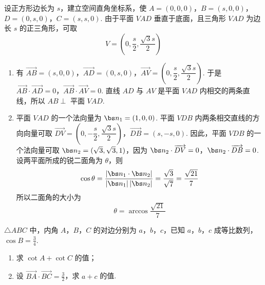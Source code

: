 \begin{solution}
设正方形边长为 \(s\)，建立空间直角坐标系，使 \(A=(0,0,0)\)，\(B=(s,0,0)\)，\(D=(0,s,0)\)，\(C=(s,s,0)\).
由于平面 \(VAD\) 垂直于底面，且三角形 \(VAD\) 为边长 \(s\) 的正三角形，可取
\[
V=\left(0,\dfrac{s}{2},\dfrac{\sqrt{3}s}{2}\right)
\]

\begin{enumerate}
\item 有 \(\overrightarrow{AB}=(s,0,0)\)，\(\overrightarrow{AD}=(0,s,0)\)，\(\overrightarrow{AV}=\left(0,\dfrac{s}{2},\dfrac{\sqrt{3}s}{2}\right)\). 于是 \(\overrightarrow{AB}\cdot\overrightarrow{AD}=0\)，\(\overrightarrow{AB}\cdot\overrightarrow{AV}=0\). 直线 \(AD\) 与 \(AV\) 是平面 \(VAD\) 内相交的两条直线，所以 \(AB\perp\) 平面 \(VAD\).

\item 平面 \(VAD\) 的一个法向量为 \(\bs n_{1}=(1,0,0)\). 平面 \(VDB\) 内两条相交直线的方向向量可取 \(\overrightarrow{DV}=\left(0,-\dfrac{s}{2},\dfrac{\sqrt{3}s}{2}\right)\)，\(\overrightarrow{DB}=(s,-s,0)\).
因此，平面 \(VDB\) 的一个法向量可取 \(\bs n_{2}=(\sqrt{3},\sqrt{3},1)\)，因为 \(\bs n_{2}\cdot\overrightarrow{DV}=0\)，\(\bs n_{2}\cdot\overrightarrow{DB}=0\). 设两平面所成的锐二面角为 \(\theta\)，则
\[
\cos\theta=\frac{|\bs n_{1}\cdot\bs n_{2}|}{|\bs n_{1}|\,|\bs n_{2}|}=\frac{\sqrt{3}}{\sqrt{7}}=\frac{\sqrt{21}}{7}
\]
所以二面角的大小为
\[
\theta=\arccos\frac{\sqrt{21}}{7}
\]
\end{enumerate}
\end{solution}

\begin{problem}
\(\triangle ABC\) 中，内角 \(A\)，\(B\)，\(C\) 的对边分别为 \(a\)，\(b\)，\(c\)，已知 \(a\)，\(b\)，\(c\) 成等比数列，\(\cos B = \frac{3}{4}\).

\begin{enumerate}
\item 求 \( \cot A + \cot C \) 的值；
\item 设 \(\overrightarrow{BA} \cdot \overrightarrow{BC} = \frac{3}{2}\)，求 \(a + c\) 的值.
\end{enumerate}
\end{problem}

